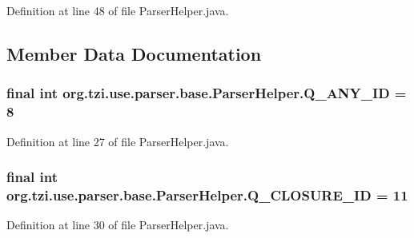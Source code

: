 Definition at line 48 of file Parser\-Helper.\-java.



\subsection{Member Data Documentation}
\hypertarget{classorg_1_1tzi_1_1use_1_1parser_1_1base_1_1_parser_helper_a623adb6bad0f14c987ec58ffee9d34e8}{
\subsubsection[{Q\-\_\-\-A\-N\-Y\-\_\-\-I\-D}]{\setlength{\rightskip}{0pt plus 5cm}final int org.\-tzi.\-use.\-parser.\-base.\-Parser\-Helper.\-Q\-\_\-\-A\-N\-Y\-\_\-\-I\-D = 8\hspace{0.3cm}{\ttfamily [static]}}}\label{classorg_1_1tzi_1_1use_1_1parser_1_1base_1_1_parser_helper_a623adb6bad0f14c987ec58ffee9d34e8}


Definition at line 27 of file Parser\-Helper.\-java.

\hypertarget{classorg_1_1tzi_1_1use_1_1parser_1_1base_1_1_parser_helper_a42cb2847048cb6693f5d958781ca1ab9}{
\subsubsection[{Q\-\_\-\-C\-L\-O\-S\-U\-R\-E\-\_\-\-I\-D}]{\setlength{\rightskip}{0pt plus 5cm}final int org.\-tzi.\-use.\-parser.\-base.\-Parser\-Helper.\-Q\-\_\-\-C\-L\-O\-S\-U\-R\-E\-\_\-\-I\-D = 11\hspace{0.3cm}{\ttfamily [static]}}}\label{classorg_1_1tzi_1_1use_1_1parser_1_1base_1_1_parser_helper_a42cb2847048cb6693f5d958781ca1ab9}


Definition at line 30 of file Parser\-Helper.\-java.

